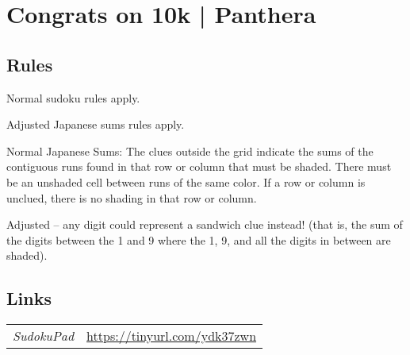 \section{Congrats on 10k | {\normalfont Panthera}}
\label{sec:21-congrats-on-10k-panthera}

\subsection*{Rules}
\begin{markdown}
Normal sudoku rules apply.

Adjusted Japanese sums rules apply.



Normal Japanese Sums: The clues outside the grid indicate the sums of the contiguous runs found in that row or column that must be shaded. There must be an unshaded cell between runs of the same color. If a row or column is unclued, there is no shading in that row or column.



Adjusted -- any digit could represent a sandwich clue instead! (that is, the sum of the digits between the 1 and 9 where the 1, 9, and all the digits in between are shaded). 
\end{markdown}
\subsection*{Links}
\begin{tabularx}{\textwidth}{l X}
\emph{SudokuPad} & \url{https://tinyurl.com/ydk37zwn} \\
\end{tabularx}
\pagebreak
